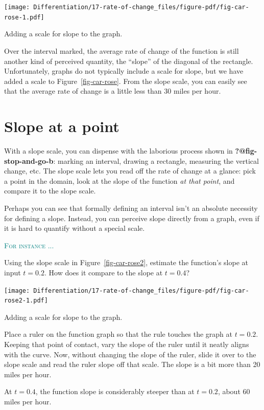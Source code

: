 \documentclass[
  letterpaper,
  DIV=11,
  numbers=noendperiod,
  oneside]{scrreprt}
\newenvironment{example}%
{%
\textcolor{teal}{\hrulefill}%
  \par\vspace{.3\baselineskip}%
  \textcolor{teal}{\scshape For instance ...}%
  \par\vspace{\baselineskip}%
}%
{\textcolor{teal}{\hrulefill}}
\begin{document}
\begin{marginfigure}

{\centering \texttt{[image: Differentiation/17-rate-of-change\_files/figure-pdf/fig-car-rose-1.pdf]}

}

\caption{\label{fig-car-rose}Adding a scale for slope to the graph.}

\end{marginfigure}

Over the interval marked, the average rate of change of the function is
still another kind of perceived quantity, the ``slope'' of the diagonal
of the rectangle. Unfortunately, graphs do not typically include a scale
for slope, but we have added a scale to Figure~\ref{fig-car-rose}. From
the slope scale, you can easily see that the average rate of change is a
little less than 30 miles per hour.

\hypertarget{slope-at-a-point}{%
\section{Slope at a point}\label{slope-at-a-point}}

With a slope scale, you can dispense with the laborious process shown in
\textbf{?@fig-stop-and-go-b}: marking an interval, drawing a rectangle,
measuring the vertical change, etc. The slope scale lets you read off
the rate of change at a glance: pick a point in the domain, look at the
slope of the function \emph{at that point}, and compare it to the slope
scale.

Perhaps you can see that formally defining an interval isn't an absolute
necessity for defining a slope. Instead, you can perceive slope directly
from a graph, even if it is hard to quantify without a special scale.

\begin{example}
Using the slope scale in Figure~\ref{fig-car-rose2}, estimate the
function's slope at input \(t=0.2\). How does it compare to the slope at
\(t=0.4\)?

\begin{marginfigure}

{\centering \texttt{[image: Differentiation/17-rate-of-change\_files/figure-pdf/fig-car-rose2-1.pdf]}

}

\caption{\label{fig-car-rose2}Adding a scale for slope to the graph.}

\end{marginfigure}

Place a ruler on the function graph so that the rule touches the graph
at \(t=0.2\). Keeping that point of contact, vary the slope of the ruler
until it neatly aligns with the curve. Now, without changing the slope
of the ruler, slide it over to the slope scale and read the ruler slope
off that scale. The slope is a bit more than 20 miles per hour.

At \(t=0.4\), the function slope is considerably steeper than at
\(t=0.2\), about 60 miles per hour.

\end{example}
\end{document}

